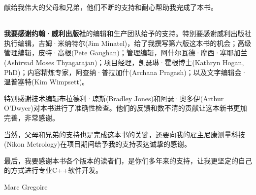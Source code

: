 献给我伟大的父母和兄弟，他们不断的支持和耐心帮助我完成了本书。

\hspace*{\fill} \\

\textbf{我要感谢约翰·威利出版社}的编辑和生产团队给予的支持。特别要感谢威利出版社执行编辑，吉姆·米纳特尔(Jim Minatel)，给了我撰写第六版这本书的机会；高级管理编辑，皮特·高根(Pete Gaughan)；管理编辑，阿什尔瓦德·摩西·塞耶加兰(Ashirvad Moses Thyagarajan)；项目经理，凯瑟琳·霍根博士(Kathryn Hogan, PhD)；内容精炼专家，阿查纳·普拉加什(Archana Pragash)；以及文字编辑金·温普塞特(Kim Wimpsett)。

特别感谢技术编辑布拉德利·琼斯(Bradley Jones)和阿瑟·奥多伊(Arthur O'Dwyer)对本书进行了准确性检查。他们的反馈和数不清的贡献让这本新书更加完善，非常感谢。

当然，父母和兄弟的支持也是完成这本书的关键，还要向我的雇主尼康测量科技(Nikon Metrology)在项目期间给予我的支持表达诚挚的感谢。

最后，我要感谢本书各个版本的读者们，是你们多年来的支持，让我更坚定的自己的方式进行专业C++软件开发。

\begin{flushright}
Marc Gregoire
\end{flushright}